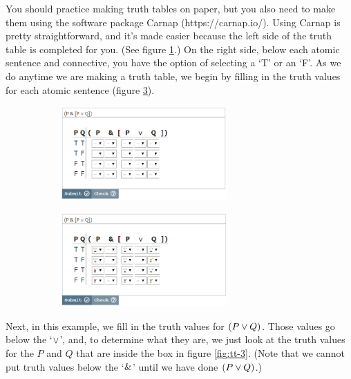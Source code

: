 You should practice making truth tables on paper, but you also need to make them using the software package Carnap (https://carnap.io/). Using Carnap is pretty straightforward, and it's made easier because the left side of the truth table is completed for you. (See figure \ref{fig:tt-1}.) On the right side, below each atomic sentence and connective, you have the option of selecting a `T' or an `F'. As we do anytime we are making a truth table, we begin by filling in the truth values for each atomic sentence (figure \ref{fig:tt-2}).  

\begin{figure}[h]
\begin{subfigure}[t]{0.50\textwidth}
\includegraphics[width=6.35cm]{tt-1.png}
\subcaption{}
\label{fig:tt-1}
\end{subfigure}
\begin{subfigure}[t]{0.50\textwidth}
\includegraphics[width=6.35cm]{tt-2.png}
\subcaption{}
\label{fig:tt-2}
\end{subfigure}
\caption{}
\end{figure} 

Next, in this example, we fill in the truth values for $(P \vee Q)$. Those values go below the `$\vee$', and, to determine what they are, we just look at the truth values for the $P$ and $Q$ that are inside the box in figure \ref{fig:tt-3}. (Note that we cannot put truth values below the `$\mathbin{\&}$' until we have done $(P \vee Q)$.)    

